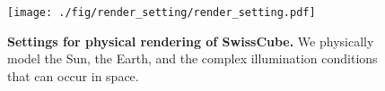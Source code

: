 
\begin{figure}[t]
    \begin{center}
    \texttt{[image: ./fig/render\_setting/render\_setting.pdf]}
    \end{center}
    \vspace{-6mm}
    \caption{{\bf Settings for physical rendering of SwissCube.} We physically model the Sun, the Earth, and the complex illumination conditions that can occur in space.}
    \label{fig:render_setting}
\end{figure}